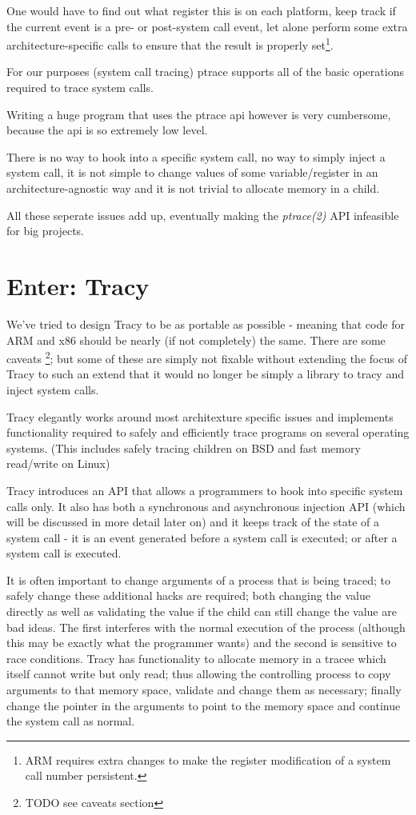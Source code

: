 \documentclass[a4paper, twoside, 10pt, twocolumn]{report}
\begin{document}
One would have to find out what register this is on each platform,
keep track if the current event is a pre- or post-system call event, let alone
perform some extra architecture-specific calls to ensure that the result is
properly set\footnote{ARM requires extra changes to make the register
modification of a system call number persistent.}.

For our purposes (system call tracing) ptrace supports all of the basic
operations required to trace system calls.

Writing a huge program that uses the ptrace api however is very cumbersome,
because the api is so extremely low level.

There is no way to hook into a specific system call, no way
to simply inject a system call, it is not simple to change values of some
variable/register in an architecture-agnostic way and it is not trivial
to allocate memory in a child.

All these seperate issues add up, eventually making the \textit{ptrace(2)} API
infeasible for big projects.

\section{Enter: Tracy}

We've tried to design Tracy to be as portable as possible - meaning that code
for ARM and x86 should be nearly (if not completely) the same. There are some
caveats \footnote{TODO see caveats section}; but some of these are simply not
fixable without extending the focus of Tracy to such an extend that it would no
longer be simply a library to tracy and inject system calls.

Tracy elegantly works around most architexture specific issues and implements
functionality required to safely and efficiently trace programs on several
operating systems. (This includes safely tracing children on BSD and fast memory
read/write on Linux)

Tracy introduces an API that allows a programmers to hook into specific system
calls only. It also has both a synchronous and asynchronous injection API (which
will be discussed in more detail later on) and it keeps track of the state of a
system call - it is an event generated before a system call is executed; or
after a system call is executed.

It is often important to change arguments of a process that is being traced; to
safely change these additional hacks are required; both changing the value
directly as well as validating the value if the child can still change the value
are bad ideas. The first interferes with the normal execution of the process
(although this may be exactly what the programmer wants) and the second is
sensitive to race conditions. Tracy has functionality to allocate memory in a
tracee which itself cannot write but only read; thus allowing the controlling
process to copy arguments to that memory space, validate and change them as
necessary; finally change the pointer in the arguments to point to the memory
space and continue the system call as normal.
\end{document}
